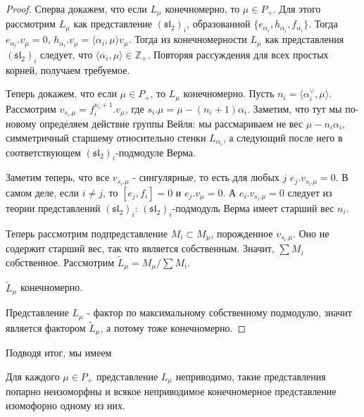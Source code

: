 \documentclass[a4article]{article}
\begin{document}
\begin{proof}
    Сперва докажем, что если $L_{\mu}$ конечномерно, то $\mu \in P_+$. Для этого рассмотрим $L_{\mu}$ как представление $(\mathfrak{sl}_2)_i$, образованной $\{e_{\alpha_i}, h_{\alpha_i}, f_{\alpha_i}\}$. Тогда $e_{\alpha_i}.v_{\mu}=0$, $h_{\alpha_i}.v_{\mu}=\langle \alpha_i, \mu\rangle v_{\mu}$. Тогда из конечномерности $L_{\mu}$ как представления $(\mathfrak{sl}_2)_i$ следует, что $\langle \alpha_i, \mu\rangle \in \mathbb{Z}_+$. Повторяя рассуждения для всех простых корней, получаем требуемое.

    Теперь докажем, что если $\mu \in P_+$, то $L_{\mu}$ конечномерно. Пусть $n_i = \langle \alpha_i^{\vee}, \mu \rangle$. Рассмотрим $v_{s_i.\mu}=f_i^{n_i+1}.v_{\mu}$, где $s_i.\mu = \mu - (n_i+1)\alpha_i$. Заметим, что тут мы по-новому определяем действие группы Вейля: мы рассмариваем не вес $\mu - n_i\alpha_i$, симметричный старшему относительно стенки $L_{\alpha_i}$, а следующий после него в соответствующем $(\mathfrak{sl}_2)_i$-подмодуле Верма. 

    Заметим теперь, что все $v_{s_i.\mu}$ - сингулярные, то есть для любых $j$ $e_{j}.v_{s_i.\mu}=0$. В самом деле, если $i \ne j$, то $[e_j, f_i]=0$ и $e_j.v_{\mu}=0$. А $e_i.v_{s_i.\mu}=0$ следует из теории представлений $(\mathfrak{sl}_2)_i$: $(\mathfrak{sl}_2)_i$-подмодуль Верма имеет старший вес $n_i$.

    Теперь рассмотрим подпредставление $M_i \subset M_{\mu}$, порожденное $v_{s_i.\mu}$. Оно не содержит старший вес, так что является собственным. Значит, $\sum M_i$ собственное. Рассмотрим $\tilde{L}_{\mu}=M_{\mu}/\sum M_i$. 
    \begin{proposition}
        $\tilde{L}_{\mu}$ конечномерно.
    \end{proposition}
    Представление $L_{\mu}$ - фактор по максимальному собственному подмодулю, значит является фактором $\tilde{L}_{\mu}$, а потому тоже конечномерно.
\end{proof}

Подводя итог, мы имеем
\begin{corollary}
    Для каждого $\mu \in P_+$ представление $L_{\mu}$ неприводимо, такие представления попарно неизоморфны и всякое неприводимое конечномерное представление изомофорно одному из них.
\end{corollary}
\end{document}
